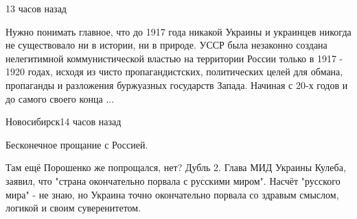 \begin{itemize}
 13 часов назад  

Нужно понимать главное, что до 1917 года никакой Украины и украинцев никогда не
существовало ни в истории, ни в природе. УССР была незаконно
создана нелегитимной коммунистической властью на территории
России только в 1917 - 1920 годах, исходя из чисто
пропагандистских, политических целей для обмана, пропаганды и
разложения буржуазных государств Запада.  Начиная с 20-х годов
и до самого своего конца ...

 Новосибирск14 часов назад  

Бесконечное прощание с Россией.

Там ещё Порошенко же попрощался, нет? Дубль 2.  Глава МИД Украины Кулеба,
заявил, что "страна окончательно порвала с русскими миром".
Насчёт "русского мира" - не знаю, но Украина точно окончательно
порвала со здравым смыслом, логикой и своим суверенитетом.

\end{itemize}
